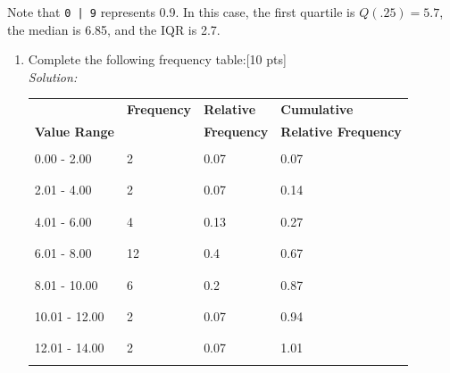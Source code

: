 \documentclass[11pt]{article}\usepackage[]{graphicx}\usepackage[]{color}
\begin{document}
\begin{enumerate}
Note that \verb!0 | 9! represents 0.9. In this case, the first quartile is $Q(.25) = 5.7$, the median is 6.85, and the IQR is 2.7.

\begin{enumerate}
  \item Complete the following frequency table:[10 pts] \\
  \emph{Solution:}
  \begin{table}[h!]
     \centering
     \begin{tabular}{|l|p{3cm}|p{3cm}|p{4cm}|}
        \hline
                             & \textbf{Frequency} & \textbf{Relative} & \textbf{Cumulative}  \\
        \textbf{Value Range} &                    & \textbf{Frequency} & \textbf{Relative Frequency} \\\hline \hline
                    &  &  &  \\
      0.00 - 2.00   &  2 & 0.07 & 0.07 \\
                    &  &  &  \\ \hline
                    &  &  &  \\
      2.01 - 4.00   &  2 & 0.07 & 0.14 \\
                    &  &  &  \\ \hline
                    &  &  &  \\
      4.01 - 6.00   &  4 & 0.13 & 0.27 \\
                    &  &  &  \\ \hline
                    &  &  &  \\
      6.01 - 8.00   &  12 & 0.4 & 0.67 \\
                    &  &  &  \\ \hline
                    &  &  &  \\
      8.01 - 10.00  &  6 & 0.2 & 0.87 \\
                    &  &  &  \\ \hline
                    &  &  &  \\
      10.01 - 12.00  &  2 & 0.07 & 0.94 \\
                    &  &  &  \\ \hline
                    &  &  &  \\
      12.01 - 14.00  &  2 & 0.07 & 1.01 \\
                    &  &  &  \\  \hline
     \end{tabular}
  \end{table}


\end{enumerate}
\end{enumerate}
\end{document}
